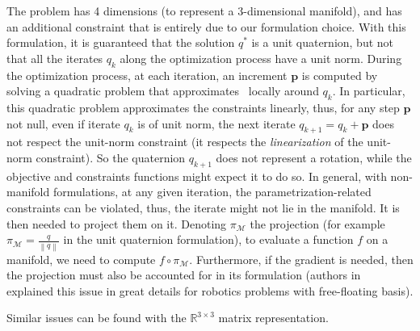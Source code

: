 The problem has 4 dimensions (to represent a 3-dimensional manifold), and has an additional constraint that is entirely due to our formulation choice.
With this formulation, it is guaranteed that the solution $q^*$ is a unit quaternion, but not that all the iterates $q_k$ along the optimization process have a unit norm.
During the optimization process, at each iteration, an increment $\mathbf{p}$ is computed by solving a quadratic problem that approximates~ locally around $q_k$.
In particular, this quadratic problem approximates the constraints linearly, thus, for any step $\mathbf{p}$ not null, even if iterate $q_k$ is of unit norm, the next iterate $q_{k+1} = q_k + \mathbf{p}$ does not respect the unit-norm constraint (it respects the \emph{linearization} of the unit-norm constraint).
So the quaternion $q_{k+1}$ does not represent a rotation, while the objective and constraints functions might expect it to do so.
In general, with non-manifold formulations, at any given iteration, the parametrization-related constraints can be violated, thus, the iterate might not lie in the manifold.
It is then needed to project them on it.
Denoting $\pi_\mathcal{M}$ the projection (for example $\pi_\mathcal{M} = \frac{q}{\left\|q\right\|}$ in the unit quaternion formulation), to evaluate a function $f$ on a manifold, we need to compute $f \circ \pi_\mathcal{M}$.
Furthermore, if the gradient is needed, then the projection must also be accounted for in its formulation (authors in~\cite{bouyarmane:humanoids:2012} explained this issue in great details for robotics problems with free-floating basis).

Similar issues can be found with the $\mathbb{R}^{3\times 3}$ matrix representation.

